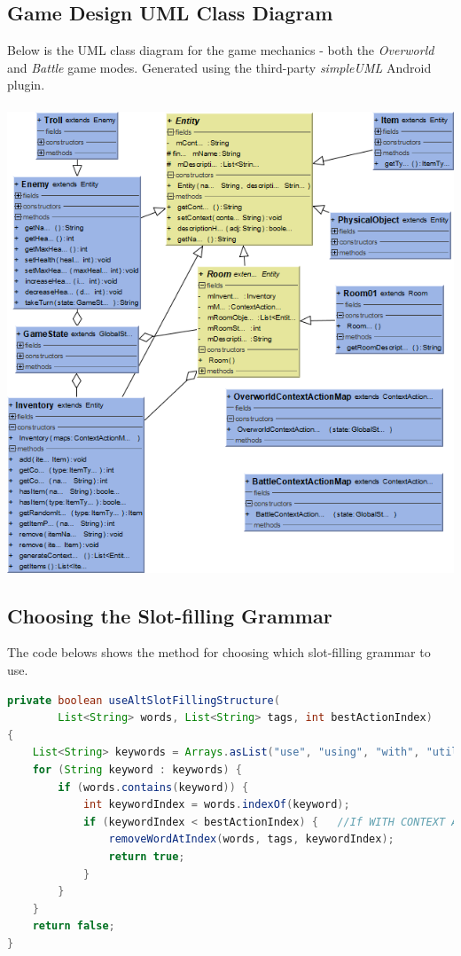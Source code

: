 \documentclass[11pt]{article}
\begin{document}
\subsection{Game Design UML Class Diagram}
\label{appendix:game-uml}
Below is the UML class diagram for the game mechanics - both the \textit{Overworld} and \textit{Battle} game modes. Generated using the third-party \textit{simpleUML} Android plugin.
\\
\\
\includegraphics[width=\textwidth]{game-uml.png}

\newpage
\subsection{Choosing the Slot-filling Grammar}
\label{appendix:useAltSlotFillingStructure}

The code belows shows the method for choosing which slot-filling grammar to use.

\begin{lstlisting}[language=Java, caption=useAltSlotFillingStructure()]
private boolean useAltSlotFillingStructure(
        List<String> words, List<String> tags, int bestActionIndex)
{
    List<String> keywords = Arrays.asList("use", "using", "with", "utilise");
    for (String keyword : keywords) {
        if (words.contains(keyword)) {
            int keywordIndex = words.indexOf(keyword);
            if (keywordIndex < bestActionIndex) {	//If WITH CONTEXT ACTION TARGET
                removeWordAtIndex(words, tags, keywordIndex);
                return true;
            }
        }
    }
    return false;
}
\end{lstlisting}
\end{document}
